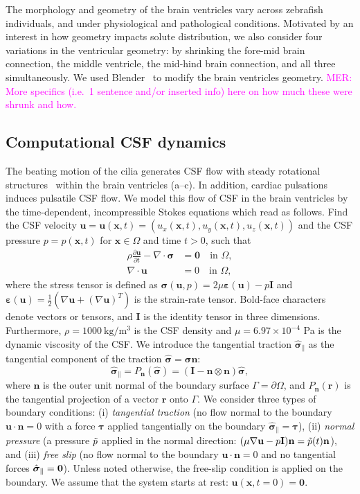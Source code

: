 \documentclass[fleqn]{wlscirep}
\newcommand{\pdifft}[1]{\frac{\partial  #1}{\partial t}}
\newcommand{\nn}{\mathbf{n}}
\newcommand{\rr}{\mathbf{r}}
\newcommand{\uu}{\mathbf{u}}
\newcommand{\xx}{\bm{x}}
\newcommand{\bsig}{\bm{\sigma}}
\newcommand{\bsigpar}{\hat{\bsig}_{\parallel}}
\newcommand{\beps}{\bm{\varepsilon}}
\newcommand{\btau}{\bm{\tau}}
\newcommand{\mer}[1]{\textcolor{magenta}{#1}}
\begin{document}
The morphology and geometry of the brain ventricles vary across zebrafish individuals, and under physiological and pathological conditions. 
Motivated by an interest in how geometry impacts solute distribution, we also consider four variations in the ventricular geometry: by shrinking the fore-mid brain connection, 
the middle ventricle, the mid-hind brain connection, and all three simultaneously. 
We used Blender~\cite{Community2018BlenderPackage} to modify the brain ventricles geometry.
\mer{MER: More specifics (i.e.~1 sentence and/or inserted info) here on how much these were shrunk and how.}

\subsection*{Computational CSF dynamics}
The beating motion of the cilia generates CSF flow with steady rotational structures~\cite{Olstad2019CiliaryDevelopment}
within the brain ventricles (a--c).
In addition, cardiac pulsations induces pulsatile CSF flow.
We model this flow of CSF in the brain ventricles by the time-dependent,
incompressible Stokes equations which read as follows.
Find the CSF velocity $\uu = \uu(\xx, t) = (u_x(\xx, t), u_y(\xx, t), u_z(\xx, t))$
and the CSF pressure $p = p(\xx, t)$ for $\xx \in \Omega$ and time $t>0$, such that
\begin{subequations}
    \begin{align}
      \rho \pdifft{\uu} - \nabla \cdot \bsig &= \mathbf{0}
      \quad \text{in } \Omega,\\
      \nabla \cdot \uu &= 0
      \quad  \text{in } \Omega,
  \end{align}
  \label{eq:stokes_eqs}%
\end{subequations}%
where the stress tensor is defined as $\bsig(\uu, p) = 2\mu\beps(\uu) - p\mathbf{I}$
and $\beps(\uu) = \frac{1}{2}\left(\nabla \uu + (\nabla\uu)^T\right)$ is the strain-rate tensor. 
Bold-face characters denote vectors or tensors, and $\mathbf{I}$ is the identity tensor in three dimensions.
Furthermore, $\rho=1000 \ \mathrm{kg/m^3}$ is the CSF density
and $\mu=6.97\times 10^{-4}$ Pa is the dynamic viscosity of the CSF.
We introduce the tangential traction $\bsigpar$ as the
tangential component of the traction $\hat{\bsig}=\bsig\nn$:
\begin{equation*}
    \bsigpar = P_{\nn}(\hat{\bsig}) = (\mathbf{I} - \nn\otimes\nn)\hat{\bsig},
\end{equation*}
where $\nn$ is the outer unit normal of the boundary surface $\Gamma = \partial\Omega$,
and $P_{\nn}(\rr)$ is the tangential projection of a vector $\rr$ onto $\Gamma$.
We consider three types of boundary conditions:
(i) \emph{tangential traction} (no flow normal to the boundary $\uu \cdot \nn = 0$ with a force $\btau$ applied tangentially on the boundary $\bsigpar = \btau$),
(ii) \emph{normal pressure} (a pressure $\Tilde{p}$ applied in the normal direction: $(\mu\nabla\uu - p\mathbf{I})\nn = \Tilde{p}(t)\nn$),
and (iii) \emph{free slip} (no flow normal to the boundary $\uu \cdot \nn = 0$ and no tangential forces $\bsigpar = {\bf 0}$).
Unless noted otherwise, the free-slip condition is applied on the boundary. We assume that the system starts at rest: $\uu(\xx, t=0) = \mathbf{0}$.
\end{document}
